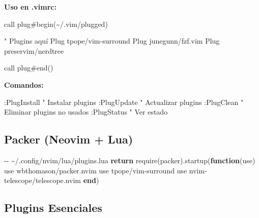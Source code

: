 \documentclass[
  doc,
  floatsintext,
  longtable,
  a4paper,
  nolmodern,
  notxfonts,
  notimes,
  12pt,
  colorlinks=true,linkcolor=blue,citecolor=blue,urlcolor=blue]{apa7}
\newenvironment{Shaded}{\begin{snugshade}}{\end{snugshade}}
\newcommand{\CommentTok}[1]{\textcolor[rgb]{0.37,0.37,0.37}{#1}}
\newcommand{\ControlFlowTok}[1]{\textcolor[rgb]{0.00,0.23,0.31}{\textbf{#1}}}
\newcommand{\FunctionTok}[1]{\textcolor[rgb]{0.28,0.35,0.67}{#1}}
\newcommand{\KeywordTok}[1]{\textcolor[rgb]{0.00,0.23,0.31}{\textbf{#1}}}
\newcommand{\NormalTok}[1]{\textcolor[rgb]{0.00,0.23,0.31}{#1}}
\newcommand{\OperatorTok}[1]{\textcolor[rgb]{0.37,0.37,0.37}{#1}}
\newcommand{\StringTok}[1]{\textcolor[rgb]{0.13,0.47,0.30}{#1}}
\newcommand{\VariableTok}[1]{\textcolor[rgb]{0.07,0.07,0.07}{#1}}
\begin{document}
\textbf{Uso en .vimrc:}

\begin{Shaded}
\begin{Highlighting}[]
\NormalTok{call plug\#begin(\textquotesingle{}\textasciitilde{}/.vim/plugged\textquotesingle{})}

\NormalTok{" Plugins aquí}
\NormalTok{Plug \textquotesingle{}tpope/vim{-}surround\textquotesingle{}}
\NormalTok{Plug \textquotesingle{}junegunn/fzf.vim\textquotesingle{}}
\NormalTok{Plug \textquotesingle{}preservim/nerdtree\textquotesingle{}}

\NormalTok{call plug\#end()}
\end{Highlighting}
\end{Shaded}

\textbf{Comandos:}

\begin{Shaded}
\begin{Highlighting}[]
\NormalTok{:PlugInstall    " Instalar plugins}
\NormalTok{:PlugUpdate     " Actualizar plugins}
\NormalTok{:PlugClean      " Eliminar plugins no usados}
\NormalTok{:PlugStatus     " Ver estado}
\end{Highlighting}
\end{Shaded}

\subsection{Packer (Neovim + Lua)}\label{packer-neovim-lua}

\begin{Shaded}
\begin{Highlighting}[]
\CommentTok{{-}{-} \textasciitilde{}/.config/nvim/lua/plugins.lua}
\ControlFlowTok{return} \FunctionTok{require}\OperatorTok{(}\StringTok{\textquotesingle{}packer\textquotesingle{}}\OperatorTok{).}\NormalTok{startup}\OperatorTok{(}\KeywordTok{function}\OperatorTok{(}\VariableTok{use}\OperatorTok{)}
\NormalTok{    use }\StringTok{\textquotesingle{}wbthomason/packer.nvim\textquotesingle{}}
\NormalTok{    use }\StringTok{\textquotesingle{}tpope/vim{-}surround\textquotesingle{}}
\NormalTok{    use }\StringTok{\textquotesingle{}nvim{-}telescope/telescope.nvim\textquotesingle{}}
\KeywordTok{end}\OperatorTok{)}
\end{Highlighting}
\end{Shaded}

\subsection{Plugins Esenciales}\label{plugins-esenciales}
\end{document}
